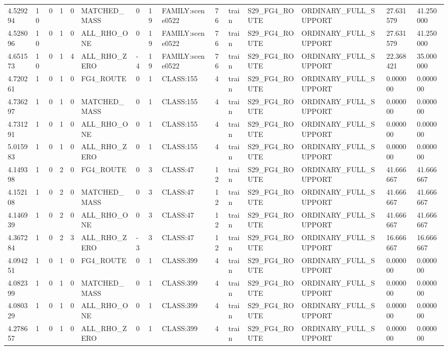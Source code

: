 \begin{tabular}{lllllllllllllll}
4.529294 & 10 & 0 & 1 & 0 & MATCHED\_MASS & 0 & 19 & FAMILY:scene0522 & 76 & train & S29\_FG4\_ROUTE & ORDINARY\_FULL\_SUPPORT & 27.631579 & 41.250000 \\
4.528096 & 10 & 0 & 1 & 0 & ALL\_RHO\_ONE & 0 & 19 & FAMILY:scene0522 & 76 & train & S29\_FG4\_ROUTE & ORDINARY\_FULL\_SUPPORT & 27.631579 & 41.250000 \\
4.651573 & 10 & 0 & 1 & 4 & ALL\_RHO\_ZERO & -4 & 19 & FAMILY:scene0522 & 76 & train & S29\_FG4\_ROUTE & ORDINARY\_FULL\_SUPPORT & 22.368421 & 35.000000 \\
4.720261 & 1 & 0 & 1 & 0 & FG4\_ROUTE & 0 & 1 & CLASS:155 & 4 & train & S29\_FG4\_ROUTE & ORDINARY\_FULL\_SUPPORT & 0.000000 & 0.000000 \\
4.736297 & 1 & 0 & 1 & 0 & MATCHED\_MASS & 0 & 1 & CLASS:155 & 4 & train & S29\_FG4\_ROUTE & ORDINARY\_FULL\_SUPPORT & 0.000000 & 0.000000 \\
4.731291 & 1 & 0 & 1 & 0 & ALL\_RHO\_ONE & 0 & 1 & CLASS:155 & 4 & train & S29\_FG4\_ROUTE & ORDINARY\_FULL\_SUPPORT & 0.000000 & 0.000000 \\
5.015983 & 1 & 0 & 1 & 0 & ALL\_RHO\_ZERO & 0 & 1 & CLASS:155 & 4 & train & S29\_FG4\_ROUTE & ORDINARY\_FULL\_SUPPORT & 0.000000 & 0.000000 \\
4.149398 & 1 & 0 & 2 & 0 & FG4\_ROUTE & 0 & 3 & CLASS:47 & 12 & train & S29\_FG4\_ROUTE & ORDINARY\_FULL\_SUPPORT & 41.666667 & 41.666667 \\
4.152108 & 1 & 0 & 2 & 0 & MATCHED\_MASS & 0 & 3 & CLASS:47 & 12 & train & S29\_FG4\_ROUTE & ORDINARY\_FULL\_SUPPORT & 41.666667 & 41.666667 \\
4.146939 & 1 & 0 & 2 & 0 & ALL\_RHO\_ONE & 0 & 3 & CLASS:47 & 12 & train & S29\_FG4\_ROUTE & ORDINARY\_FULL\_SUPPORT & 41.666667 & 41.666667 \\
4.367284 & 1 & 0 & 2 & 3 & ALL\_RHO\_ZERO & -3 & 3 & CLASS:47 & 12 & train & S29\_FG4\_ROUTE & ORDINARY\_FULL\_SUPPORT & 16.666667 & 16.666667 \\
4.094251 & 1 & 0 & 1 & 0 & FG4\_ROUTE & 0 & 1 & CLASS:399 & 4 & train & S29\_FG4\_ROUTE & ORDINARY\_FULL\_SUPPORT & 0.000000 & 0.000000 \\
4.082399 & 1 & 0 & 1 & 0 & MATCHED\_MASS & 0 & 1 & CLASS:399 & 4 & train & S29\_FG4\_ROUTE & ORDINARY\_FULL\_SUPPORT & 0.000000 & 0.000000 \\
4.080329 & 1 & 0 & 1 & 0 & ALL\_RHO\_ONE & 0 & 1 & CLASS:399 & 4 & train & S29\_FG4\_ROUTE & ORDINARY\_FULL\_SUPPORT & 0.000000 & 0.000000 \\
4.278657 & 1 & 0 & 1 & 0 & ALL\_RHO\_ZERO & 0 & 1 & CLASS:399 & 4 & train & S29\_FG4\_ROUTE & ORDINARY\_FULL\_SUPPORT & 0.000000 & 0.000000 \\

\end{tabular}
